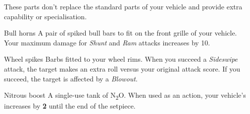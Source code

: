 
These parts don't replace the standard parts of your vehicle and provide extra capability or specialisation.

\begin{describe}{Bull horns}
  A pair of spiked bull bars to fit on the front grille of your vehicle. Your maximum damage for \emph{Shunt} and \emph{Ram} attacks increases by 10.
\end{describe}

\begin{describe}{Wheel spikes}
  Barbs fitted to your wheel rims. When you succeed a \emph{Sideswipe} attack, the target makes an extra  roll versus your original attack score. If you succeed, the target is affected by a \emph{Blowout}.
\end{describe}

\begin{describe}{Nitrous boost}
  A single-use tank of N\textsubscript{2}O. When used as an action, your vehicle's  increases by \textbf{2} until the end of the setpiece.
\end{describe}
